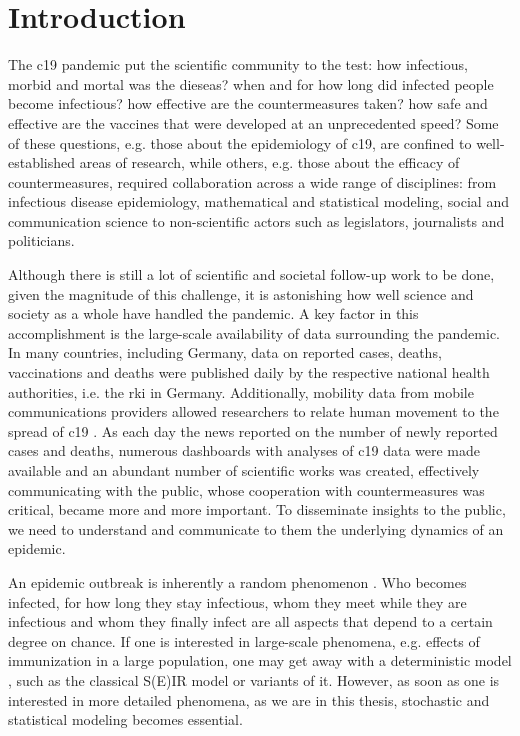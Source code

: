 \chapter{Introduction}

The \gls{c19} pandemic put the scientific community to the test: how infectious, morbid and mortal was the dieseas? when and for how long did infected people become infectious? how effective are the countermeasures taken? how safe and effective are the vaccines that were developed at an unprecedented speed? Some of these questions, e.g. those about the epidemiology of \acrshort{c19}, are confined to well-established areas of research, while others, e.g. those about the efficacy of countermeasures, required collaboration across a wide range of disciplines: from infectious disease epidemiology, mathematical and statistical modeling, social and communication science to non-scientific actors such as legislators, journalists and politicians.

Although there is still a lot of scientific and societal follow-up work to be done, given the magnitude of this challenge, it is astonishing how well science and society as a whole have handled the pandemic. A key factor in this accomplishment is the large-scale availability of data surrounding the pandemic. In many countries, including Germany, data on reported cases, deaths, vaccinations and deaths were published daily by the respective national health authorities, i.e. the \gls{rki} \cite{RobertKoch-Institut2022SARSCoV2,RobertKoch-Institut2021COVID19Hospitalisierungen} in Germany. Additionally, mobility data from mobile communications providers allowed researchers to relate human movement to the spread of \acrshort{c19} \cite{Kraemer2020Effect,Schlosser2020COVID19}. 
As each day the news reported on the number of newly reported cases and deaths, numerous dashboards with analyses of \acrshort{c19} data were made available and an abundant number of scientific works was created, effectively communicating with the public, whose cooperation with countermeasures was critical, became more and more important. To disseminate insights to the public, we need to understand and communicate to them the underlying dynamics of an epidemic.

An epidemic outbreak is inherently a random phenomenon \cite{Diekmann2013Mathematical}. Who becomes infected, for how long they stay infectious, whom they meet while they are infectious and whom they finally infect are all aspects that depend to a certain degree on chance. If one is interested in large-scale phenomena, e.g. effects of immunization in a large population, one may get away with a deterministic model \cite{Britton2019Stochastic}, such as the classical S(E)IR model \cite{Kermack1927Contribution} or variants of it. However, as soon as one is interested in more detailed phenomena, as we are in this thesis, stochastic and statistical modeling becomes essential. 

